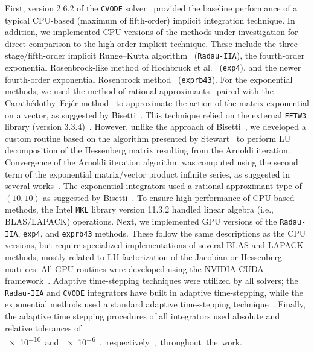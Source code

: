 \documentclass[preprint]{elsarticle}
\begin{document}
First, version 2.6.2 of the \texttt{CVODE} solver~\cite{Hindmarsh:2005hg} provided the baseline performance of a typical CPU-based (maximum of fifth-order) implicit integration technique.
In addition, we implemented CPU versions of the methods under investigation for direct comparison to the high-order implicit technique.
These include the three-stage\slash fifth-order implicit Runge--Kutta algorithm~\cite{wanner1991solving} (\texttt{Radau-IIA}), the fourth-order exponential Rosenbrock-like method of Hochbruck et al.~\cite{Hochbruck:1998} (\texttt{exp4}), and the newer fourth-order exponential Rosenbrock method~\cite{Hockbruck:2009} (\texttt{exprb43}).
For the exponential methods, we used the method of rational approximants~\cite{gallopoulos:1992} paired with the Carath\'edothy--Fej\'er method~\cite{trefethen:2006,kyle_niemeyer_2016_44291} to approximate the action of the matrix exponential on a vector, as suggested by Bisetti~\cite{Bisetti:2012jw}.
This technique relied on the external \texttt{FFTW3} library (version 3.3.4)~\cite{frigo2005design}.
However, unlike the approach of Bisetti~\cite{Bisetti:2012jw}, we developed a custom routine based on the algorithm presented by Stewart~\cite{stewart:1998} to perform LU decomposition of the Hessenberg matrix resulting from the Arnoldi iteration.
Convergence of the Arnoldi iteration algorithm was computed using the second term of the exponential matrix\slash vector product infinite series, as suggested in several works~\cite{Bisetti:2012jw,saad:1992}.
The exponential integrators used a rational approximant type of $\left(10,10\right)$ as suggested by Bisetti~\cite{Bisetti:2012jw}.
To ensure high performance of CPU-based methods, the Intel \texttt{MKL} library version 11.3.2 handled linear algebra (i.e., BLAS/LAPACK) operations.
Next, we implemented GPU versions of the \texttt{Radau-IIA}, \texttt{exp4}, and \texttt{exprb43} methods.
These follow the same descriptions as the CPU versions, but require specialized implementations of several BLAS and LAPACK methods, mostly related to LU factorization of the Jacobian or Hessenberg matrices.
All GPU routines were developed using the NVIDIA CUDA framework~\cite{Buck:2008aa,NVIDIA:2015aa}.
Adaptive time-stepping techniques were utilized by all solvers; the \texttt{Radau-IIA} and \texttt{CVODE} integrators have built in adaptive time-stepping, while the exponential methods used a standard adaptive time-stepping technique~\cite{wanner1991solving}.
Finally, the adaptive time stepping procedures of all integrators used absolute and relative tolerances of \SI{e-10} and \SI{e-6}, respectively, throughout the work.
\end{document}
